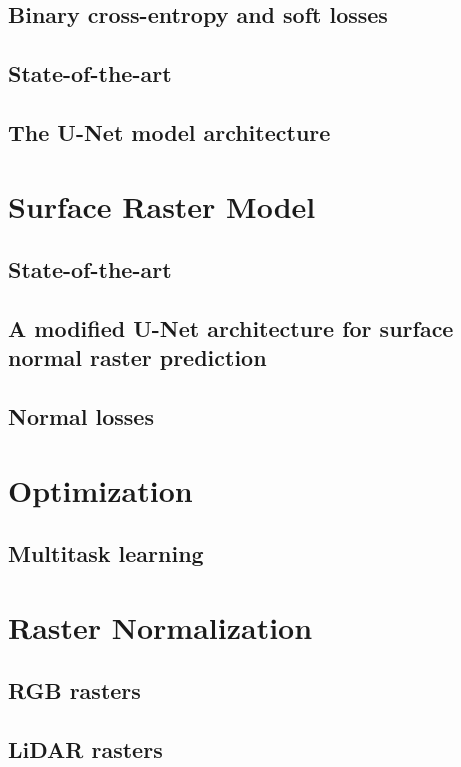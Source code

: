 \subsection{Binary cross-entropy and soft losses}
\subsection{State-of-the-art}
\subsection{The U-Net model architecture}

\section{Surface Raster Model}
\subsection{State-of-the-art}
\subsection{A modified U-Net architecture for surface normal raster prediction}
\subsection{Normal losses}

\section{Optimization}
\subsection{Multitask learning}

\section{Raster Normalization}
\subsection{RGB rasters}
\subsection{LiDAR rasters}
